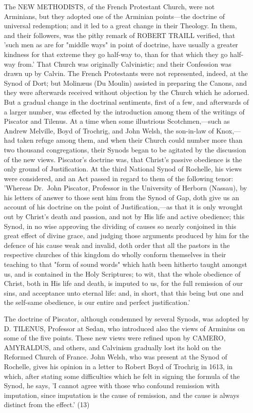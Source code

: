 \documentclass[
]{book}
\begin{document}
The NEW METHODISTS, of the French Protestant Church, were not Arminians, but they adopted one of the Arminian points---the doctrine of universal redemption; and it led to a great change in their Theology. In them, and their followers, was the pithy remark of ROBERT TRAILL verified, that 'such men as are for "middle ways" in point of doctrine, have usually a greater kindness for that extreme they go half-way to, than for that which they go half-way from.' That Church was originally Calvinistic; and their Confession was drawn up by Calvin. The French Protestants were not represented, indeed, at the Synod of Dort; but Molinæus (Du Moulin) assisted in preparing the Canons, and they were afterwards received without objection by the Church which he adorned. But a gradual change in the doctrinal sentiments, first of a few, and afterwards of a larger number, was effected by the introduction among them of the writings of Piscator and Tilenus. At a time when some illustrious Scotchmen,---such as Andrew Melville, Boyd of Trochrig, and John Welsh, the son-in-law of Knox,---had taken refuge among them, and when their Church could number more than two thousand congregations, their Synods began to be agitated by the discussion of the new views. Piscator's doctrine was, that Christ's passive obedience is the only ground of Justification. At the third National Synod of Rochelle, his views were considered, and an Act passed in regard to them of the following tenor: 'Whereas Dr.~John Piscator, Professor in the University of Herborn (Nassau), by his letters of answer to those sent him from the Synod of Gap, doth give us an account of his doctrine on the point of Justification,---as that it is only wrought out by Christ's death and passion, and not by His life and active obedience; this Synod, in no wise approving the dividing of causes so nearly conjoined in this great effect of divine grace, and judging those arguments produced by him for the defence of his cause weak and invalid, doth order that all the pastors in the respective churches of this kingdom do wholly conform themselves in their teaching to that "form of sound words" which hath been hitherto taught amongst us, and is contained in the Holy Scriptures; to wit, that the whole obedience of Christ, both in His life and death, is imputed to us, for the full remission of our sins, and acceptance unto eternal life: and, in short, that this being but one and the self-same obedience, is our entire and perfect justification.'

The doctrine of Piscator, although condemned by several Synods, was adopted by D. TILENUS, Professor at Sedan, who introduced also the views of Arminius on some of the five points. These new views were refined upon by CAMERO, AMYRALDUS, and others, and Calvinism gradually lost its hold on the Reformed Church of France. John Welsh, who was present at the Synod of Rochelle, gives his opinion in a letter to Robert Boyd of Trochrig in 1613, in which, after stating some difficulties which he felt in signing the formula of the Synod, he says, 'I cannot agree with those who confound remission with imputation, since imputation is the cause of remission, and the cause is always distinct from the effect.' (13)
\end{document}
